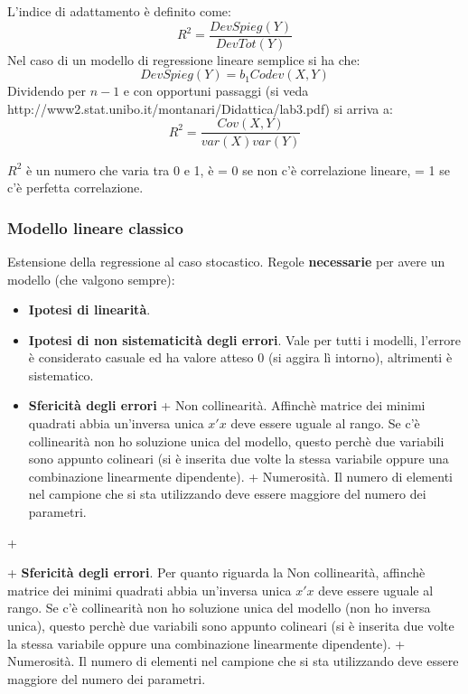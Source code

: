 \documentclass[]{article}
\begin{document}
L'indice di adattamento è definito come:
\begin{equation}
R^2 = \frac{DevSpieg(Y)}{DevTot(Y)}
\end{equation}
Nel caso di un modello di regressione lineare semplice si ha che:
\begin{equation}
DevSpieg(Y) = b_1 Codev(X, Y)
\end{equation}
Dividendo per $n-1$ e con opportuni passaggi (si veda http://www2.stat.unibo.it/montanari/Didattica/lab3.pdf) si arriva a:
\begin{equation}
R^2 = \frac{Cov(X, Y)}{var(X)var(Y)}
\end{equation}

$R^2$ è un numero che varia tra 0 e 1, è = 0 se non c'è correlazione lineare, = 1 se c'è perfetta correlazione.

\subsubsection{Modello lineare classico}\label{modello-lineare-classico}

Estensione della regressione al caso stocastico. Regole
\textbf{necessarie} per avere un modello (che valgono sempre):
\begin{itemize}
\item \textbf{Ipotesi di linearità}.
\item \textbf{Ipotesi di non sistematicità
degli errori}. Vale per tutti i modelli, l'errore è considerato casuale
ed ha valore atteso 0 (si aggira lì intorno), altrimenti è sistematico.
\item  \textbf{Sfericità degli errori} + Non collinearità. Affinchè matrice
dei minimi quadrati abbia un'inversa unica \(x'x\) deve essere uguale al
rango. Se c'è collinearità non ho soluzione unica del modello, questo
perchè due variabili sono appunto colineari (si è inserita due volte la
stessa variabile oppure una combinazione linearmente dipendente). +
Numerosità. Il numero di elementi nel campione che si sta utilizzando
deve essere maggiore del numero dei parametri.
\end{itemize} +
 
+ \textbf{Sfericità degli errori}.
Per quanto riguarda la Non collinearità, affinchè matrice
dei minimi quadrati abbia un'inversa unica \(x'x\) deve essere uguale al
rango. Se c'è collinearità non ho soluzione unica del modello (non ho inversa unica), questo
perchè due variabili sono appunto colineari (si è inserita due volte la
stessa variabile oppure una combinazione linearmente dipendente). +
Numerosità. Il numero di elementi nel campione che si sta utilizzando
deve essere maggiore del numero dei parametri.
\end{document}
